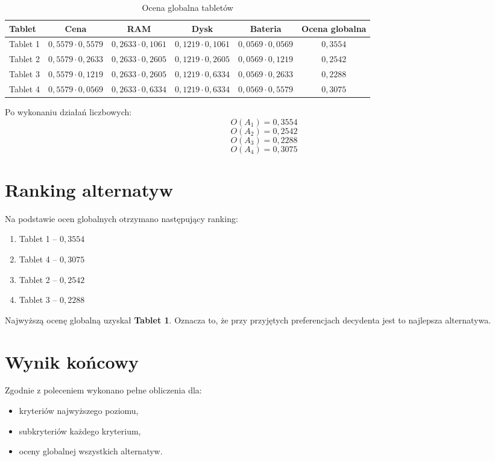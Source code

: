 \documentclass[12pt,a4paper]{article}
\begin{document}
\begin{table}[H]
\centering
\caption{Ocena globalna tabletów}
\begin{tabular}{lccccc}
\toprule
\textbf{Tablet} & \textbf{Cena} & \textbf{RAM} & \textbf{Dysk} & \textbf{Bateria} & \textbf{Ocena globalna} \\
\midrule
Tablet 1 & \(0{,}5579\cdot0{,}5579\) & \(0{,}2633\cdot0{,}1061\) & \(0{,}1219\cdot0{,}1061\) & \(0{,}0569\cdot0{,}0569\) & \(0{,}3554\) \\
Tablet 2 & \(0{,}5579\cdot0{,}2633\) & \(0{,}2633\cdot0{,}2605\) & \(0{,}1219\cdot0{,}2605\) & \(0{,}0569\cdot0{,}1219\) & \(0{,}2542\) \\
Tablet 3 & \(0{,}5579\cdot0{,}1219\) & \(0{,}2633\cdot0{,}2605\) & \(0{,}1219\cdot0{,}6334\) & \(0{,}0569\cdot0{,}2633\) & \(0{,}2288\) \\
Tablet 4 & \(0{,}5579\cdot0{,}0569\) & \(0{,}2633\cdot0{,}6334\) & \(0{,}1219\cdot0{,}6334\) & \(0{,}0569\cdot0{,}5579\) & \(0{,}3075\) \\
\bottomrule
\end{tabular}
\end{table}

Po wykonaniu działań liczbowych:
\[
O(A_1)=0{,}3554
\]
\[
O(A_2)=0{,}2542
\]
\[
O(A_3)=0{,}2288
\]
\[
O(A_4)=0{,}3075
\]

\section{Ranking alternatyw}

Na podstawie ocen globalnych otrzymano następujący ranking:
\begin{enumerate}
    \item Tablet 1 -- \(0{,}3554\)
    \item Tablet 4 -- \(0{,}3075\)
    \item Tablet 2 -- \(0{,}2542\)
    \item Tablet 3 -- \(0{,}2288\)
\end{enumerate}

Najwyższą ocenę globalną uzyskał \textbf{Tablet 1}. Oznacza to, że przy przyjętych preferencjach decydenta jest to najlepsza alternatywa.

\section{Wynik końcowy}

Zgodnie z poleceniem wykonano pełne obliczenia dla:
\begin{itemize}
    \item kryteriów najwyższego poziomu,
    \item subkryteriów każdego kryterium,
    \item oceny globalnej wszystkich alternatyw.
\end{itemize}
\end{document}

